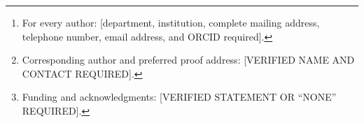 \author{[VERIFIED AUTHOR LIST REQUIRED]%
\thanks{For every author: [department, institution, complete mailing address,
telephone number, email address, and ORCID required].}%
\thanks{Corresponding author and preferred proof address:
[VERIFIED NAME AND CONTACT REQUIRED].}%
\thanks{Funding and acknowledgments: [VERIFIED STATEMENT OR ``NONE'' REQUIRED].}}

